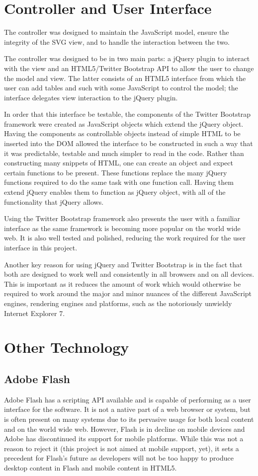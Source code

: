 \section{Controller and User Interface}
The controller was designed to maintain the Java\-Script model, ensure the integrity of the SVG view, and to handle the interaction between the two.

The controller was designed to be in two main parts: a jQuery plugin to interact with the view and an HTML5\slash Twitter Bootstrap API to allow the user to change the model and view. The latter consists of an HTML5 interface from which the user can add tables and such with some Java\-Script to control the model; the interface delegates view interaction to the jQuery plugin.

In order that this interface be testable, the components of the Twitter Bootstrap framework were created as Java\-Script objects which extend the jQuery object. Having the components as controllable objects instead of simple HTML to be inserted into the DOM allowed the interface to be constructed in such a way that it was predictable, testable and much simpler to read in the code. Rather than constructing many snippets of HTML, one can create an object and expect certain functions to be present. These functions replace the many jQuery functions required to do the same task with one function call. Having them extend jQuery enables them to function as jQuery object, with all of the functionality that jQuery allows.

Using the Twitter Bootstrap framework also presents the user with a familiar interface as the same framework is becoming more popular on the world wide web. It is also well tested and polished, reducing the work required for the user interface in this project.

Another key reason for using jQuery and Twitter Bootstrap is in the fact that both are designed to work well and consistently in all browsers and on all devices. This is important as it reduces the amount of work which would otherwise be required to work around the major and minor nuances of the different Java\-Script engines, rendering engines and platforms, such as the notoriously unwieldy Internet Explorer 7.

\section{Other Technology}
\subsection{Adobe Flash}
Adobe Flash has a scripting API available and is capable of performing as a user interface for the software. It is not a native part of a web browser or system, but is often present on many systems due to its pervasive usage for both local content and on the world wide web. However, Flash is in decline on mobile devices and Adobe has discontinued its support for mobile platforms. While this was not a reason to reject it (this project is not aimed at mobile support, yet), it sets a precedent for Flash's future as developers will not be too happy to produce desktop content in Flash and mobile content in HTML5.

